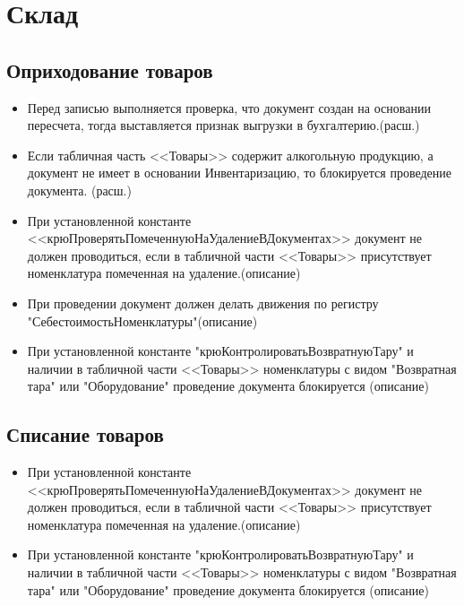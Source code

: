 \section{Склад}
\subsection{Оприходование товаров}


\begin{itemize}
	\item Перед записью выполняется проверка, что документ создан на основании пересчета, тогда выставляется признак выгрузки в бухгалтерию.(расш.)
	\item Если табличная часть <<Товары>> содержит алкогольную продукцию, а документ не имеет в основании Инвентаризацию, то блокируется проведение документа.
	(расш.)
	\item При установленной константе <<крюПроверятьПомеченнуюНаУдалениеВДокументах>>
	документ не должен проводиться, если в табличной части <<Товары>> присутствует
	номенклатура помеченная на удаление.(описание)
	\item При проведении документ должен делать движения по регистру "СебестоимостьНоменклатуры"(описание)
	\item При установленной константе "крюКонтролироватьВозвратнуюТару" и наличии в табличной части <<Товары>> номенклатуры
	с видом "Возвратная тара" или "Оборудование" проведение документа блокируется (описание)
\end{itemize}

\subsection{Списание товаров}

\begin{itemize}
	\item При установленной константе <<крюПроверятьПомеченнуюНаУдалениеВДокументах>>
	документ не должен проводиться, если в табличной части <<Товары>> присутствует
	номенклатура помеченная на удаление.(описание)
	\item При установленной константе "крюКонтролироватьВозвратнуюТару" и наличии в табличной части <<Товары>> номенклатуры
	с видом "Возвратная тара" или "Оборудование" проведение документа блокируется (описание)

\end{itemize}



